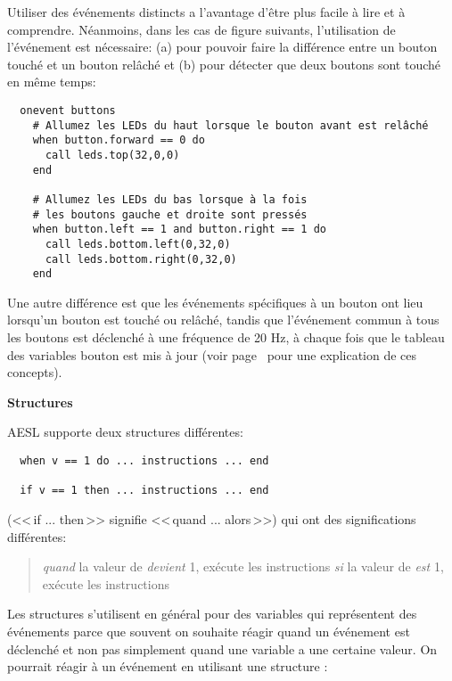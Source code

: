 Utiliser des événements distincts a l'avantage d'être plus facile à lire et à comprendre.
Néanmoins, dans les cas de figure suivants, l'utilisation de l'événement  est nécessaire:
(a) pour pouvoir faire la différence entre un bouton touché et un bouton relâché
et
(b) pour détecter que deux boutons sont touché en même temps:

\begin{footnotesize}
\begin{verbatim}
  onevent buttons
    # Allumez les LEDs du haut lorsque le bouton avant est relâché
    when button.forward == 0 do
      call leds.top(32,0,0)
    end

    # Allumez les LEDs du bas lorsque à la fois
    # les boutons gauche et droite sont pressés
    when button.left == 1 and button.right == 1 do
      call leds.bottom.left(0,32,0)
      call leds.bottom.right(0,32,0)
    end
\end{verbatim}
\end{footnotesize}

Une autre différence est que les événements spécifiques à un bouton
ont lieu lorsqu'un bouton est touché ou relâché,
tandis que l'événement commun à tous les boutons est déclenché à une fréquence de 20 Hz,
à chaque fois que le tableau des variables bouton est mis à jour (voir page~\pageref{pg.hz}
pour une explication de ces concepts).

\textbf{\large Structures }

AESL supporte deux structures différentes:
\begin{footnotesize}
\begin{verbatim}
  when v == 1 do ... instructions ... end

  if v == 1 then ... instructions ... end
\end{verbatim}
\end{footnotesize}
(<<\,if ... then\,>> signifie <<\,quand ... alors\,>>) qui ont des significations différentes:
\begin{quote}
\emph{quand} la valeur de  \emph{devient} 1, exécute les instructions
\emph{si} la valeur de  \emph{est} 1, exécute les instructions
\end{quote}

Les structures  s'utilisent en général pour des variables qui représentent des événements
parce que souvent on souhaite réagir quand un événement est déclenché et non pas simplement quand une variable a une certaine valeur.
On pourrait réagir à un événement  en utilisant une structure :

